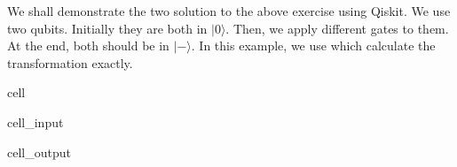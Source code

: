 \documentclass[letterpaper,10pt,english]{jupyterBook}
\begin{document}
\sphinxAtStartPar
{}

\sphinxAtStartPar
We shall demonstrate the two solution to the above exercise using Qiskit.  We use two qubits.  Initially they are both in \(|0\rangle\).  Then, we apply different gates to them. At the end, both should be in \(|-\rangle\).  In this example, we use  which calculate the transformation exactly.

\begin{sphinxuseclass}{cell}\begin{sphinxVerbatimInput}

\begin{sphinxuseclass}{cell_input}
\begin{sphinxVerbatim}[commandchars=\\\{\}]
   
   
  

  



\end{sphinxVerbatim}

\end{sphinxuseclass}\end{sphinxVerbatimInput}
\begin{sphinxVerbatimOutput}

\begin{sphinxuseclass}{cell_output}
\noindent{}

\end{sphinxuseclass}\end{sphinxVerbatimOutput}

\end{sphinxuseclass}
\end{document}
